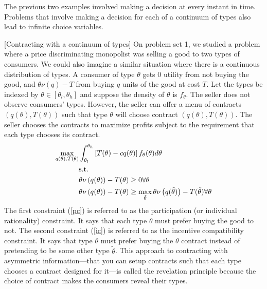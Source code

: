 The previous two examples involved making a decision at every instant
in time. Problems that involve making a decision for each of a
continuum of types also lead to infinite choice variables.
\begin{example}\label{ex:contract}[Contracting with a continuum of
  types]
  On problem set 1, we studied a problem where a price discriminating
  monopolist was selling a good to two types of consumers. We could
  also imagine a similar situation where there is a continuous
  distribution of types. A consumer of type $\theta$ gets $0$ utility
  from not buying the good, and $\theta \nu(q) - T$ from buying $q$
  units of the good at cost $T$. Let the types be indexed by $\theta \in
  [\theta_l,\theta_h]$ and suppose the density of $\theta$ is $f_\theta$. The
  seller does not observe consumers' types. However, the seller can
  offer a menu of contracts $(q(\theta),T(\theta))$ such that type
  $\theta$ will choose contract $(q(\theta),T(\theta))$. The seller
  chooses the contracts to maximize profits subject to the requirement
  that each type chooses its contract.
  \begin{align}
    \max_{q(\theta),T(\theta)} & \int_{\theta_l}^{\theta_h} 
    \left[T(\theta) - cq(\theta)\right]
    f_\theta(\theta) d\theta \notag \\
    & \text{s.t.} \notag \\
    &\theta \nu\left(q(\theta)\right) - T(\theta) \geq 0  \forall
    \theta \label{pc} \\
    &\theta \nu\left(q(\theta)\right) - T(\theta) \geq
    \max_{\tilde{\theta}} \theta \nu\left(q(\tilde{\theta}) \right) -
    T(\tilde{\theta}) \forall \theta \label{ic} 
  \end{align}
  The first constraint (\ref{pc}) is referred to as the participation
  (or individual rationality)
  constraint. It says that each type $\theta$ must prefer buying the
  good to not. The second constraint  (\ref{ic}) is referred to as the
  incentive compatibility constraint. It says that type $\theta$ must
  prefer buying the $\theta$ contract instead of pretending to be
  some other type $\tilde{\theta}$. This approach to contracting with
  asymmetric information---that you can setup contracts such that each
  type chooses a contract designed for it---is called the revelation
  principle because the choice of contract makes the consumers reveal
  their types. 
\end{example}
